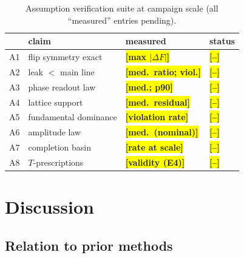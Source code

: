\documentclass[twocolumn,preprintnumbers,amsmath,amssymb,pra,floatfix]{revtex4-2}
\newcommand{\PH}[1]{\colorbox{yellow}{\textbf{\small [#1]}}}
\begin{document}
\begin{table}[t]
\centering
\caption{Assumption verification suite at campaign scale (all
``measured'' entries pending).}
\label{tab:assumptions}
\begin{tabular}{@{}llll@{}}
\toprule
 & claim & measured & status \\
\midrule
A1 & flip symmetry exact & \PH{max $|\Delta F|$} & \PH{--} \\
A2 & leak $<$ main line & \PH{med.\ ratio; viol.} & \PH{--} \\
A3 & phase readout law & \PH{med.; p90} & \PH{--} \\
A4 & lattice support & \PH{med.\ residual} & \PH{--} \\
A5 & fundamental dominance & \PH{violation rate} & \PH{--} \\
A6 & amplitude law & \PH{med.\ (nominal)} & \PH{--} \\
A7 & completion basin & \PH{rate at scale} & \PH{--} \\
A8 & $T$-prescriptions & \PH{validity (E4)} & \PH{--} \\
\bottomrule
\end{tabular}
\end{table}

\section{Discussion}
\label{sec:discussion}

\subsection{Relation to prior methods}
\end{document}
